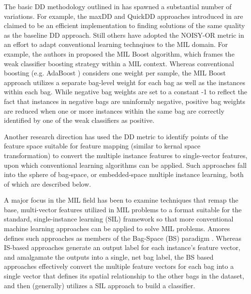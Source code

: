 \documentclass[12pt,dvips]{report}
\numberwithin{equation}{section}
\begin{document}
The basic DD methodology outlined in \cite{maro98} has spawned a substantial number of variations. For example, the maxDD and QuickDD approaches introduced in \cite{foulds2010speeding} are claimed to be an efficient implementation to finding solutions of the same quality as the baseline DD approach. Still others have adopted the NOISY-OR metric in an effort to adapt conventional learning technqiues to the MIL domain.  For example, the authors in \cite{zhan06} proposed the MIL Boost algorithm, which frames the weak classifier boosting strategy within a MIL context.  Whereas conventional boosting (e.g. AdaBoost \cite{yoav96}) considers one weight per sample, the MIL Boost approach utilizes a separate bag-level weight for each bag as well as the instances within each bag.  While negative bag weights are set to a constant -1 to reflect the fact that instances in negative bags are uninformly negative, positive bag weights are reduced when one or more instances within the same bag are correctly identified by one of the weak classifiers as positive.

Another research direction has used the DD metric to identify points of the feature space suitable for feature mapping \cite{amor13,chen06_miles,chen04_ddsvm} (similar to kernal space transformation) to convert the multiple instance features to single-vector features, upon which conventional learning algorithms can be applied.  Such approaches fall into the sphere of bag-space, or embedded-space multiple instance learning, both of which are described below.

A major focus in the MIL field has been to examine techniques that remap the base, multi-vector features utilized in MIL problems to a format suitable for the standard, single-instance learning (SIL) framework so that more conventional machine learning approaches can be applied to solve MIL problems. Amores defines such approaches as members of the Bag-Space (BS) paradigm \cite{amor13}. Whereas IS-based approaches generate an output label for each instance's feature vector, and amalgamate the outputs into a single, net bag label, the BS based approaches effectively convert the multiple feature vectors for each bag into a single vector that defines its spatial relationship to the other bags in the dataset, and then (generally) utilizes a SIL approach to build a classifier. 
\end{document}
